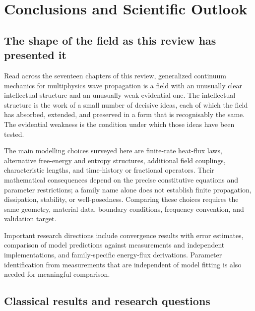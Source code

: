 
\section{Conclusions and Scientific Outlook}

\label{sec:conclusions}

\subsection{The shape of the field as this review has presented it}

\label{sec:17.1}

Read across the seventeen chapters of this review, generalized continuum mechanics for multiphysics wave propagation is a field with an unusually clear intellectual structure and an unusually weak evidential one. The intellectual structure is the work of a small number of decisive ideas, each of which the field has absorbed, extended, and preserved in a form that is recognisably the same. The evidential weakness is the condition under which those ideas have been tested.

The main modelling choices surveyed here are finite-rate heat-flux laws, alternative free-energy and entropy structures, additional field couplings, characteristic lengths, and time-history or fractional operators. Their mathematical consequences depend on the precise constitutive equations and parameter restrictions; a family name alone does not establish finite propagation, dissipation, stability, or well-posedness. Comparing these choices requires the same geometry, material data, boundary conditions, frequency convention, and validation target.

Important research directions include convergence results with error estimates, comparison of model predictions against measurements and independent implementations, and family-specific energy-flux derivations. Parameter identification from measurements that are independent of model fitting is also needed for meaningful comparison.

\subsection{Classical results and research questions}

